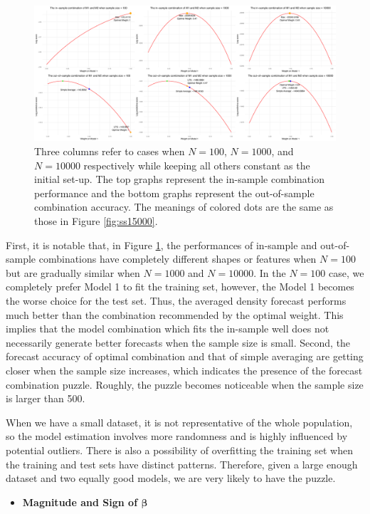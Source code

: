 \documentclass{monashthesis}
\begin{document}
\begin{figure}[ht]
\centering
\includegraphics[scale=0.35]{figures/Sample_Size_100-10000.png}
\caption{Three columns refer to cases when $N=100$, $N=1000$, and $N=10000$ respectively while keeping all others constant as the initial set-up. The top graphs represent the in-sample combination performance and the bottom graphs represent the out-of-sample combination accuracy. The meanings of colored dots are the same as those in Figure \ref{fig:ss15000}.}
\label{fig:ss}
\end{figure}

First, it is notable that, in Figure \ref{fig:ss}, the performances of in-sample and out-of-sample combinations have completely different shapes or features when \(N=100\) but are gradually similar when \(N=1000\) and \(N=10000\). In the \(N=100\) case, we completely prefer Model 1 to fit the training set, however, the Model 1 becomes the worse choice for the test set. Thus, the averaged density forecast performs much better than the combination recommended by the optimal weight. This implies that the model combination which fits the in-sample well does not necessarily generate better forecasts when the sample size is small. Second, the forecast accuracy of optimal combination and that of simple averaging are getting closer when the sample size increases, which indicates the presence of the forecast combination puzzle. Roughly, the puzzle becomes noticeable when the sample size is larger than 500.

When we have a small dataset, it is not representative of the whole population, so the model estimation involves more randomness and is highly influenced by potential outliers. There is also a possibility of overfitting the training set when the training and test sets have distinct patterns. Therefore, given a large enough dataset and two equally good models, we are very likely to have the puzzle.

\begin{itemize}
\tightlist
\item
  \bf{Magnitude and Sign of $\pmb{\beta}$}
\end{itemize}
\end{document}

